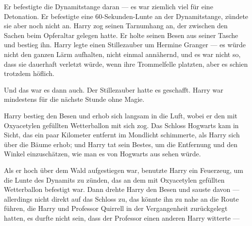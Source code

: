 

Er befestigte die Dynamitstange daran — es war ziemlich viel für eine Detonation.
Er befestigte eine 60-Sekunden-Lunte an der Dynamitstange, zündete sie aber noch nicht an.
Harry zog seinen Tarnumhang an, der zwischen den Sachen beim Opferaltar gelegen hatte.
Er holte seinen Besen aus seiner Tasche und bestieg ihn.
Harry legte einen Stillezauber um Hermine Granger — es würde nicht den ganzen Lärm aufhalten, nicht einmal annähernd, und es war nicht so, dass sie dauerhaft verletzt würde, wenn ihre Trommelfelle platzten, aber es schien trotzdem höflich.

Und das war es dann auch. Der Stillezauber hatte es geschafft. Harry war mindestens für die nächste Stunde ohne Magie.

Harry bestieg den Besen und erhob sich langsam in die Luft, wobei er den mit Oxyacetylen gefüllten Wetterballon mit sich zog. Das Schloss Hogwarts kam in Sicht, das ein paar Kilometer entfernt im Mondlicht schimmerte, als Harry sich über die Bäume erhob; und Harry tat sein Bestes, um die Entfernung und den Winkel einzuschätzen, wie man es von Hogwarts aus sehen würde.

Als er hoch über dem Wald aufgestiegen war, benutzte Harry ein Feuerzeug, um die Lunte des Dynamits zu zünden, das an dem mit Oxyacetylen gefüllten Wetterballon befestigt war. Dann drehte Harry den Besen und sauste davon — allerdings nicht direkt auf das Schloss zu, das könnte ihn zu nahe an die Route führen, die Harry und Professor Quirrell in der Vergangenheit zurückgelegt hatten, es durfte nicht sein, dass der Professor einen anderen Harry witterte —

